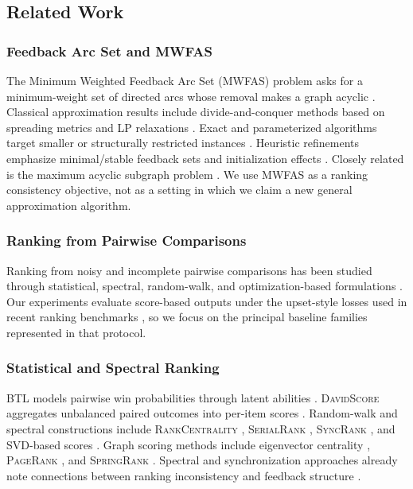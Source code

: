 \documentclass{article}
\begin{document}
\subsection{Related Work}
\label{sec:related}

\subsubsection{Feedback Arc Set and MWFAS}
The Minimum Weighted Feedback Arc Set (MWFAS) problem asks for a minimum-weight set of directed arcs whose removal makes a graph acyclic \citet{K72,FPP20}. Classical approximation results include divide-and-conquer methods based on spreading metrics and LP relaxations \citet{EG95,EG2000}. Exact and parameterized algorithms target smaller or structurally restricted instances \citet{BA21,HM21,RS06,SJ21}. Heuristic refinements emphasize minimal/stable feedback sets and initialization effects \citet{c24,c25}. Closely related is the maximum acyclic subgraph problem \citet{HR94}. We use MWFAS as a ranking consistency objective, not as a setting in which we claim a new general approximation algorithm.

\subsubsection{Ranking from Pairwise Comparisons}
Ranking from noisy and incomplete pairwise comparisons has been studied through statistical, spectral, random-walk, and optimization-based formulations \citet{H00,CGZ21,SW16}. Our experiments evaluate score-based outputs under the upset-style losses used in recent ranking benchmarks \citet{he22}, so we focus on the principal baseline families represented in that protocol.

\subsubsection{Statistical and Spectral Ranking}
\textsc{BTL} models pairwise win probabilities through latent abilities \citet{BTL}. \textsc{DavidScore} aggregates unbalanced paired outcomes into per-item scores \citet{DavidScore}. Random-walk and spectral constructions include \textsc{RankCentrality} \citet{NS17}, \textsc{SerialRank} \citet{SerialRank}, \textsc{SyncRank} \citet{SyncRank}, and SVD-based scores \citet{SVD_RS_NRS}. Graph scoring methods include eigenvector centrality \citet{EigenvectorCentrality}, \textsc{PageRank} \citet{PageRank}, and \textsc{SpringRank} \citet{SpringRank}. Spectral and synchronization approaches already note connections between ranking inconsistency and feedback structure \citet{SerialRank,SyncRank}.
\end{document}
